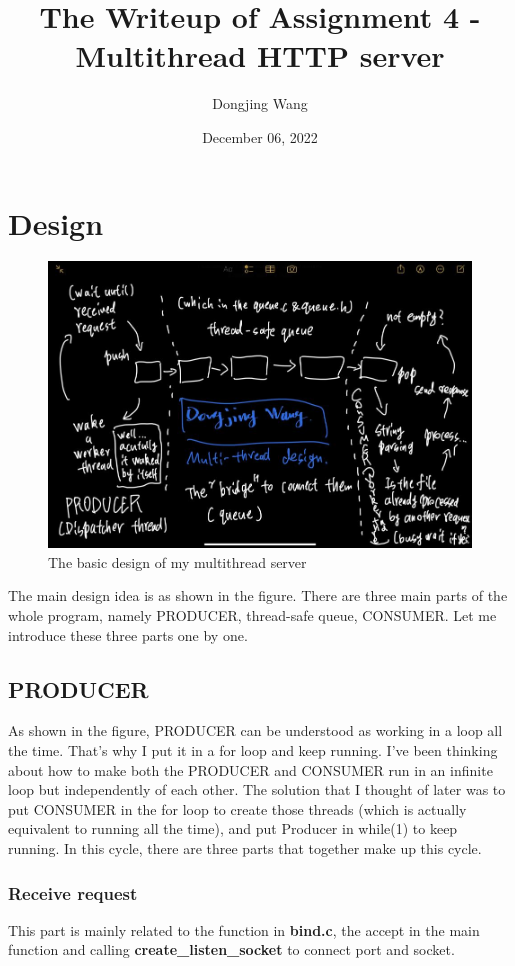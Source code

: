 \documentclass{article}
\title{The Writeup of Assignment 4 - Multithread HTTP server}
\author{Dongjing Wang}
\date{December 06, 2022}
\begin{document}
\maketitle

\section{Design}
    \begin{figure}[htbp]
        \centering
        \includegraphics[width=1.1\textwidth]{IMG_0066.jpg}
        \caption{The basic design of my multithread server}
        \label{fig:design}
    \end{figure}
    The main design idea is as shown in the figure. There are three main parts of the whole program, namely PRODUCER, thread-safe queue, CONSUMER. Let me introduce these three parts one by one.
    \subsection{PRODUCER}
        As shown in the figure, PRODUCER can be understood as working in a loop all the time. That's why I put it in a for loop and keep running. I've been thinking about how to make both the PRODUCER and CONSUMER run in an infinite loop but independently of each other. The solution that I thought of later was to put CONSUMER in the for loop to create those threads (which is actually equivalent to running all the time), and put Producer in while(1) to keep running. In this cycle, there are three parts that together make up this cycle.
        \subsubsection{Receive request}
            This part is mainly related to the function in \textbf{bind.c}, the accept in the main function and calling \textbf{create\_listen\_socket} to connect port and socket.
\end{document}

